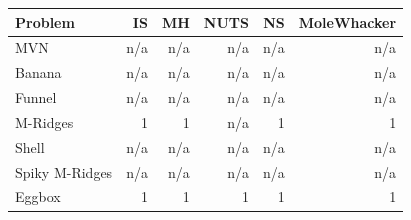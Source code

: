 \begin{tabular}{lrrrrr}
\toprule
Problem & IS & MH & NUTS & NS & MoleWhacker \\
\midrule
MVN & n/a & n/a & n/a & n/a & n/a \\
Banana & n/a & n/a & n/a & n/a & n/a \\
Funnel & n/a & n/a & n/a & n/a & n/a \\
M-Ridges & 1 & 1 & n/a & 1 & 1 \\
Shell & n/a & n/a & n/a & n/a & n/a \\
Spiky M-Ridges & n/a & n/a & n/a & n/a & n/a \\
\midrule
Eggbox & 1 & 1 & 1 & 1 & 1 \\
\bottomrule
\end{tabular}

